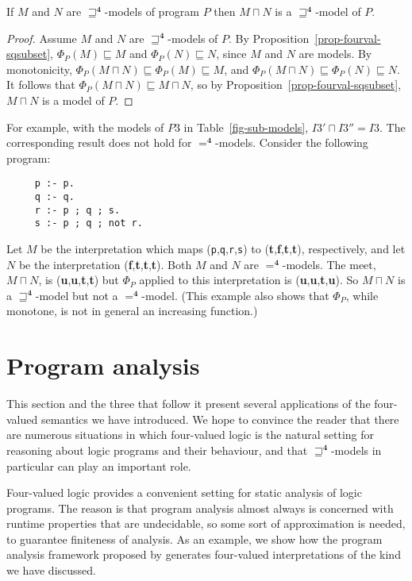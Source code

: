 \documentclass{tlp}
\newcommand{\Quad}{\ensuremath{\mathbf{4}}}
\begin{document}
\begin{proposition} \rm
\label{prop-mod-meet}
If $M$ and $N$ are $\sqsupseteq^\Quad$-models of program $P$ then $M \sqcap N$ is a
$\sqsupseteq^\Quad$-model of $P$.
\end{proposition}
\begin{proof}
Assume $M$ and $N$ are $\sqsupseteq^\Quad$-models of $P$.
By Proposition~\ref{prop-fourval-sqsubset},
$\Phi_P(M) \sqsubseteq M$ and $\Phi_P(N) \sqsubseteq N$, since $M$ and $N$
are models.  
By monotonicity, $\Phi_P(M \sqcap N) \sqsubseteq \Phi_P(M) \sqsubseteq M$,
and $\Phi_P(M \sqcap N) \sqsubseteq \Phi_P(N) \sqsubseteq N$.
It follows that
$\Phi_P(M \sqcap N) \sqsubseteq M \sqcap N$, 
so by Proposition~\ref{prop-fourval-sqsubset}, 
$M \sqcap N$ is a model of $P$.
\end{proof}
For example, with the models of $P3$ in Table~\ref{fig-sub-models},
$I3' \sqcap I3'' = I3$.
The corresponding result does not hold for $=^\Quad$-models. 
Consider the following program:
\begin{verbatim}
     p :- p.
     q :- q.
     r :- p ; q ; s.
     s :- p ; q ; not r.
\end{verbatim}
Let $M$ be the interpretation
which maps (\texttt{p},\texttt{q},\texttt{r},\texttt{s}) to
(\textbf{t},\textbf{f},\textbf{t},\textbf{t}), respectively, and let $N$
be the interpretation (\textbf{f},\textbf{t},\textbf{t},\textbf{t}).
Both $M$ and $N$ are $=^\Quad$-models.  The meet, $M \sqcap N$, is
(\textbf{u},\textbf{u},\textbf{t},\textbf{t}) but $\Phi_P$ applied to
this interpretation is (\textbf{u},\textbf{u},\textbf{t},\textbf{u}).
So $M \sqcap N$ is a $\sqsupseteq^\Quad$-model but not a $=^\Quad$-model.
(This example also shows that $\Phi_P$, while monotone, is not
in general an increasing function.)


\section{Program analysis}
\label{sec-proganalysis}

This section and the three that follow it present several applications 
of the four-valued semantics we have introduced.
We hope to convince the reader that there are numerous situations
in which four-valued logic is the natural setting for reasoning about
logic programs and their behaviour, and that $\sqsupseteq^\Quad$-models in
particular can play an important role.

Four-valued logic provides a convenient setting for static analysis
of logic programs.
The reason is that program analysis almost always is concerned with
runtime properties that are undecidable, so some sort of
approximation is needed, to guarantee finiteness of analysis.
As an example, we show how the program analysis framework proposed by
 generates four-valued interpretations of the kind
we have discussed.
\end{document}
